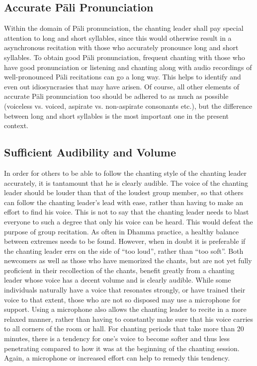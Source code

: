 \ifbfiveversion\vspace{-0.1cm}\fi

\subsection*{Accurate Pāli Pronunciation}

  Within the domain of Pāli pronunciation, the chanting leader shall pay special attention to long and short syllables, since this would otherwise result in a asynchronous recitation with those who accurately pronounce long and short syllables. To obtain good Pāli pronunciation, frequent chanting with those who have good pronunciation or listening and chanting along with audio recordings of well-pronounced Pāli recitations can go a long way. This helps to identify and even out idiosyncrasies that may have arisen. Of course, all other elements of accurate Pāli pronunciation too should be adhered to as much as possible (voiceless vs. voiced, aspirate vs. non-aspirate consonants etc.), but the difference between long and short syllables is the most important one in the present context.

\subsection*{Sufficient Audibility and Volume}

  In order for others to be able to follow the chanting style of the chanting leader accurately, it is tantamount that he is clearly audible. The voice of the chanting leader should be louder than that of the loudest group member, so that others can follow the chanting leader's lead with ease, rather than having to make an effort to find his voice. This is not to say that the chanting leader needs to blast everyone to such a degree that only his voice can be heard. This would defeat the purpose of group recitation. As often in Dhamma practice, a healthy balance between extremes needs to be found. However, when in doubt it is preferable if the chanting leader errs on the side of ``too loud'', rather than ``too soft''. Both newcomers as well as those who have memorized the chants, but are not yet fully proficient in their recollection of the chants, benefit greatly from a chanting leader whose voice has a decent volume and is clearly audible. While some individuals naturally have a voice that resonates strongly, or have trained their voice to that extent, those who are not so disposed may use a microphone for support. Using a microphone also allows the chanting leader to recite in a more relaxed manner, rather than having to constantly make sure that his voice carries to all corners of the room or hall. For chanting periods that take more than 20 minutes, there is a tendency for one's voice to become softer and thus less penetrating compared to how it was at the beginning of the chanting session. Again, a microphone or increased effort can help to remedy this tendency.

